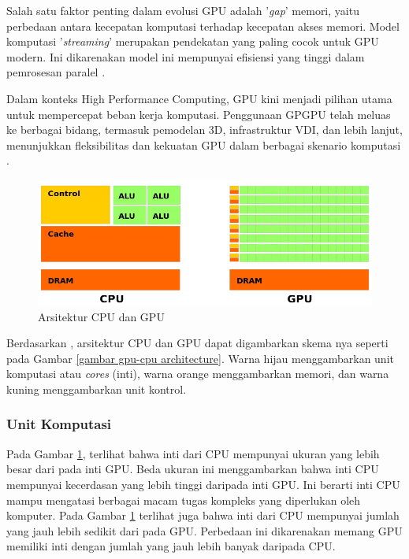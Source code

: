 
Salah satu faktor penting dalam evolusi GPU adalah '\emph{gap}' memori, yaitu
perbedaan antara kecepatan komputasi terhadap kecepatan akses memori. Model
komputasi '\emph{streaming}' merupakan pendekatan yang paling cocok untuk GPU
modern. Ini dikarenakan model ini mempunyai efisiensi yang tinggi dalam
pemrosesan paralel \citep{pharrGPUGemsProgramming2005}.


Dalam konteks High Performance Computing, GPU kini menjadi pilihan utama untuk
mempercepat beban kerja komputasi. Penggunaan GPGPU telah meluas ke berbagai
bidang, termasuk pemodelan 3D, infrastruktur VDI, dan lebih lanjut, menunjukkan
fleksibilitas dan kekuatan GPU dalam berbagai skenario komputasi
\citep{hagoortExploringGPUArchitecture2023}.

\begin{figure}[H]
  \centering
  \includegraphics[width=14cm]{images/cpu-gpu-architecture.png}
  \caption{Arsitektur CPU dan GPU}
  \label{gambar gpu-cpu architecture}
\end{figure}

Berdasarkan \cite{learningUnderstandingArchitectureGPU2023}, arsitektur CPU dan
GPU dapat digambarkan skema nya seperti pada Gambar \ref{gambar gpu-cpu
  architecture}. Warna hijau menggambarkan unit komputasi atau \emph{cores}
(inti), warna orange menggambarkan memori, dan warna kuning menggambarkan unit
kontrol.

\subsubsection{Unit Komputasi}
\label{unit komputasi}

Pada Gambar \ref{gambar gpu-cpu architecture}, terlihat bahwa inti dari CPU
mempunyai ukuran yang lebih besar dari pada inti GPU. Beda ukuran ini
menggambarkan bahwa inti CPU mempunyai kecerdasan yang lebih tinggi daripada
inti GPU. Ini berarti inti CPU mampu mengatasi berbagai macam tugas kompleks
yang diperlukan oleh komputer. Pada Gambar \ref{gambar gpu-cpu architecture}
terlihat juga bahwa inti dari CPU mempunyai jumlah yang jauh lebih sedikit dari
pada GPU. Perbedaan ini dikarenakan memang GPU memiliki inti dengan jumlah yang
jauh lebih banyak daripada CPU.

